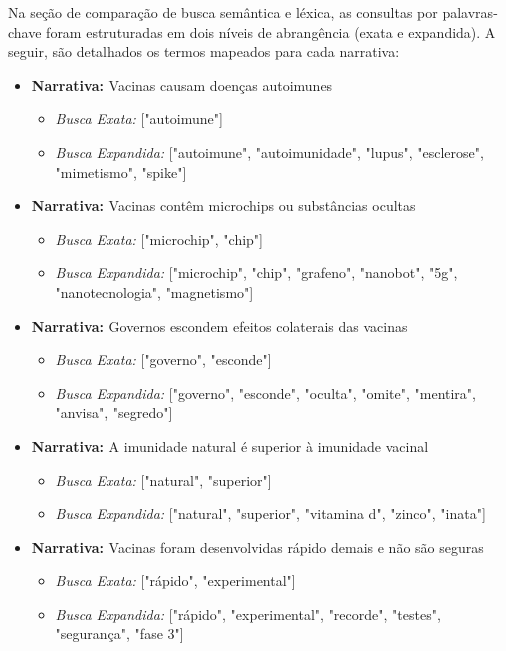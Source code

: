 \documentclass[10pt,twocolumn,a4paper]{article}
\begin{document}
Na seção de comparação de busca semântica e léxica, as consultas por palavras-chave foram estruturadas em dois níveis de abrangência (exata e expandida). A seguir, são detalhados os termos mapeados para cada narrativa:

\begin{itemize}
    \item \textbf{Narrativa:} Vacinas causam doenças autoimunes
    \begin{itemize}
        \item \textit{Busca Exata:} ["autoimune"]
        \item \textit{Busca Expandida:} ["autoimune", "autoimunidade", "lupus", "esclerose", "mimetismo", "spike"]
    \end{itemize}
    \item \textbf{Narrativa:} Vacinas contêm microchips ou substâncias ocultas
    \begin{itemize}
        \item \textit{Busca Exata:} ["microchip", "chip"]
        \item \textit{Busca Expandida:} ["microchip", "chip", "grafeno", "nanobot", "5g", "nanotecnologia", "magnetismo"]
    \end{itemize}
    \item \textbf{Narrativa:} Governos escondem efeitos colaterais das vacinas
    \begin{itemize}
        \item \textit{Busca Exata:} ["governo", "esconde"]
        \item \textit{Busca Expandida:} ["governo", "esconde", "oculta", "omite", "mentira", "anvisa", "segredo"]
    \end{itemize}
    \item \textbf{Narrativa:} A imunidade natural é superior à imunidade vacinal
    \begin{itemize}
        \item \textit{Busca Exata:} ["natural", "superior"]
        \item \textit{Busca Expandida:} ["natural", "superior", "vitamina d", "zinco", "inata"]
    \end{itemize}
    \item \textbf{Narrativa:} Vacinas foram desenvolvidas rápido demais e não são seguras
    \begin{itemize}
        \item \textit{Busca Exata:} ["rápido", "experimental"]
        \item \textit{Busca Expandida:} ["rápido", "experimental", "recorde", "testes", "segurança", "fase 3"]
    \end{itemize}
\end{itemize}
\end{document}

